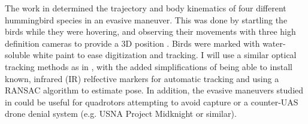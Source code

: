 \documentclass[onecolumn,10pt]{IEEEtran}
\begin{document}
The work in \cite{cheng2016flight} determined the trajectory and body kinematics of four different hummingbird species in an evasive maneuver. This was done by startling the birds while they were hovering, and observing their movements with three high definition cameras to provide a 3D position \cite{hedrick2008software, theriault2014protocol, jackson20163d}. Birds were marked with water-soluble white paint to ease digitization and tracking. I will use a similar optical tracking methods as in \cite{cheng2016flight, hedrick2008software, theriault2014protocol, jackson20163d}, with the added simplifications of being able to install known, infrared (IR) relfective markers for automatic tracking and using a RANSAC algorithm to estimate pose. In addition, the evasive maneuvers studied in \cite{cheng2016flight, sholtis2015field} could be useful for quadrotors attempting to avoid capture or a counter-UAS drone denial system (e.g. USNA Project Midknight or similar).

\end{document}
